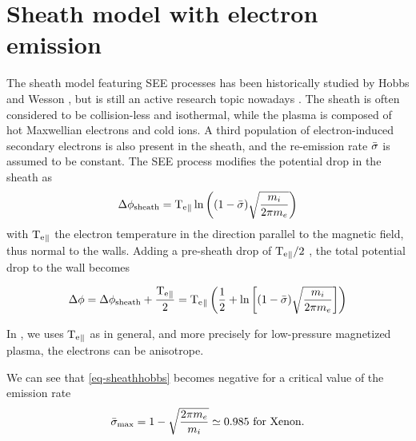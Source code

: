 
\section{Sheath model with electron emission}
  \label{sec-sheath}
  
  
  The sheath model featuring SEE processes has been historically studied by Hobbs and Wesson \citet{hobbs1967}, but is still an active research topic nowadays \citep{ahedo2005}.
  The sheath is often considered to be collision-less and isothermal, while the plasma is composed of hot Maxwellian electrons and cold ions. A third population of electron-induced secondary electrons is also present in the sheath, and the re-emission rate $ \bar{\sigma }$ is assumed to be constant.
  The SEE process modifies the potential drop in the sheath as \citep{hobbs1967}
  \begin{equation} \label{eq-sheathhobbs}
    \Delta \phi_{\rm sheath} = \mathrm{T_e}_{\parallel} \ln \left( (1 -  \bar{\sigma }) \sqrt{\frac{m_i}{2 \pi m_e}}   \right)
  \end{equation}
  with $\mathrm{T_e}_{\parallel}$ the electron temperature in the direction parallel to the magnetic field, thus normal to the walls.
  Adding a pre-sheath drop of $\mathrm{T_e}_{\parallel}/2$ \citep{ahedo2002}, the total potential drop to the wall becomes
  
  \begin{equation} \label{eq-total_drop}
    \Delta \phi = \Delta \phi_{\rm sheath} + \frac{\mathrm{T_e}_{\parallel}}{2} =  \mathrm{T_e}_{\parallel} \left( \frac{1}{2} + \ln \left[ (1 -  \bar{\sigma }) \sqrt{\frac{m_i}{2 \pi m_e}}   \right]  \right)
  \end{equation}
  
  In , we uses $\mathrm{T_e}_{\parallel}$ as in general, and more precisely for low-pressure magnetized plasma, the electrons can be anisotrope.
  
  We can see that \cref{eq-sheathhobbs} becomes negative for a critical value of the emission rate
  \begin{equation} \label{eq-ratecrone}
     \bar{\sigma }_{\rm max} = 1 - \sqrt{\frac{2 \pi m_e}{m_i}} \simeq 0.985 \text{ for Xenon.}
  \end{equation}
  
